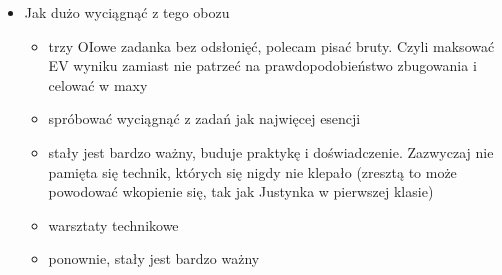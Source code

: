 \documentclass{article}
\begin{document}
\begin{itemize}
    \item Jak dużo wyciągnąć z tego obozu
    \begin{itemize}
        \item trzy OIowe zadanka bez odsłonięć, polecam pisać bruty. Czyli maksować EV wyniku zamiast nie patrzeć na prawdopodobieństwo zbugowania i celować w maxy
        \item spróbować wyciągnąć z zadań jak najwięcej esencji
        \item stały jest bardzo ważny, buduje praktykę i doświadczenie. Zazwyczaj nie pamięta się technik, których się nigdy nie klepało (zresztą to może powodować wkopienie się, tak jak Justynka w pierwszej klasie)
        \item warsztaty technikowe
        \item ponownie, stały jest bardzo ważny
    \end{itemize}
\end{itemize}
\end{document}
